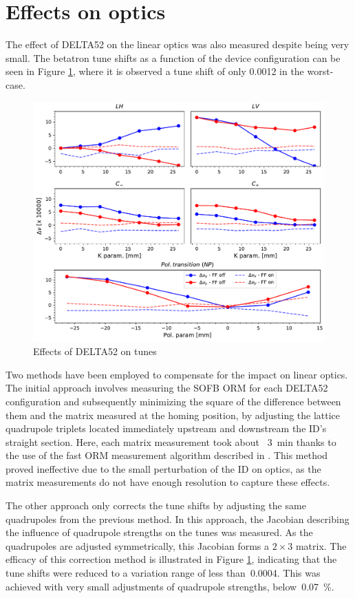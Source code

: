 \documentclass[a4paper,
               keeplastbox,   %
               ]{jacow}
\begin{document}
\section{Effects on optics}

The effect of DELTA52 on the linear optics was also measured despite being very small. The betatron tune shifts as a function of the device configuration can be seen in Figure \ref{fig:tunes}, where it is observed a tune shift of only 0.0012 in the worst-case.

\begin{figure}[]
    \centering
   \includegraphics[width=\columnwidth]{THPS18_f4.pdf}
   \caption{Effects of DELTA52 on tunes}
   \label{fig:tunes}
\end{figure}

Two methods have been employed to compensate for the impact on linear optics. The initial approach involves measuring the SOFB ORM for each DELTA52 configuration and subsequently minimizing the square of the difference between them and the matrix measured at the homing position, by adjusting the lattice quadrupole triplets located immediately upstream and downstream the ID's straight section. Here, each matrix measurement took about ~\SI{3}{\minute} thanks to the use of the fast ORM measurement algorithm described in \cite{Velloso:IPAC22-MOPOTK002}. This method proved ineffective due to the small perturbation of the ID on optics, as the matrix measurements do not have enough resolution to capture these effects.

The other approach only corrects the tune shifts by adjusting the same quadrupoles from the previous method. In this approach, the Jacobian describing the influence of quadrupole strengths on the tunes was measured. As the quadrupoles are adjusted symmetrically, this Jacobian forms a $2 \times 3$ matrix. The efficacy of this correction method is illustrated in Figure \ref{fig:tunes}, indicating that the tune shifts were reduced to a variation range of less than~\num{0.0004}. This was achieved with very small adjustments of quadrupole strengths, below~\SI{0.07}{\percent}.
\end{document}
